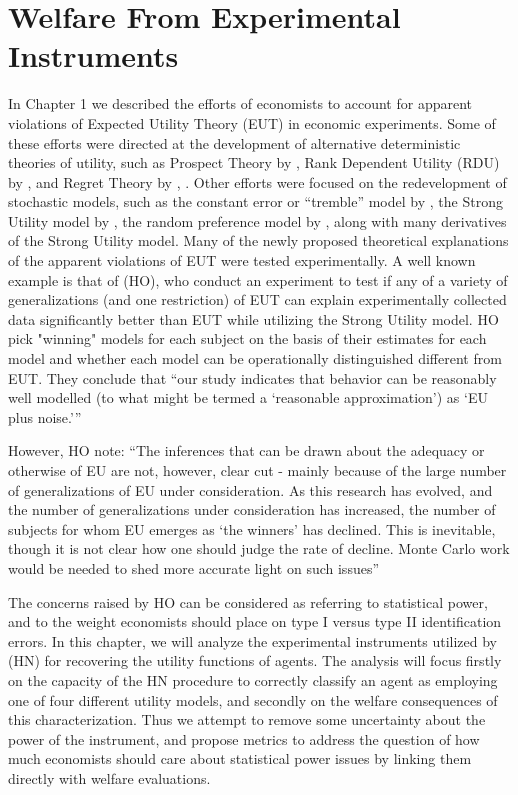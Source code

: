 \documentclass[../main.tex]{subfiles}
\begin{document}
\onehalfspacing
\setcounter{chapter}{3}

\chapter{Welfare From Experimental Instruments}

\lltoc %

In Chapter 1 we described the efforts of economists to account for apparent violations of Expected Utility Theory (EUT) in economic experiments.
Some of these efforts were directed at the development of alternative deterministic theories of utility, such as Prospect Theory by \textcite{Kahneman1979}, Rank Dependent Utility (RDU) by \textcite{Quiggin1982}, and Regret Theory by \textcite{Bell1982}, \textcite{Loomes1982}.
Other efforts were focused on the redevelopment of stochastic models, such as the constant error or \enquote{tremble} model by \textcite{Harless1994}, the Strong Utility model by \textcite{Hey1994}, the random preference model by \textcite{Loomes1995}, along with many derivatives of the Strong Utility model.
Many of the newly proposed theoretical explanations of the apparent violations of EUT were tested experimentally.
A well known example is that of \textcite{Hey1994} (HO), who conduct an experiment to test if any of a variety of generalizations (and one restriction) of EUT can explain experimentally collected data significantly better than EUT while utilizing the Strong Utility model.
HO pick "winning" models for each subject on the basis of their estimates for each model and whether each model can be operationally distinguished different from EUT.
They conclude that \enquote{our study indicates that behavior can be reasonably well modelled (to what might be termed a \enquote{reasonable approximation}) as \enquote{EU plus noise.}}

However, HO note:
\enquote{The inferences that can be drawn \textelp{} about the adequacy or otherwise of EU are not, however, clear cut - mainly because of the large number of generalizations of EU under consideration.
As this research has evolved, and the number of generalizations under consideration has increased, the number of subjects for whom EU emerges as \enquote{the winners} has declined.
This is inevitable, though it is not clear how one should judge the rate of decline.
\textelp{} Monte Carlo work would be needed to shed more accurate light on such issues}

The concerns raised by HO can be considered as referring to statistical power, and to the weight economists should place on type I versus type II identification errors.
In this chapter, we will analyze the experimental instruments utilized by \textcite{Harrison2016} (HN) for recovering the utility functions of agents.
The analysis will focus firstly on the capacity of the HN procedure to correctly classify an agent as employing one of four different utility models, and secondly on the welfare consequences of this characterization.
Thus we attempt to remove some uncertainty about the power of the instrument, and propose metrics to address the question of how much economists should care about statistical power issues by linking them directly with welfare evaluations.
\end{document}
